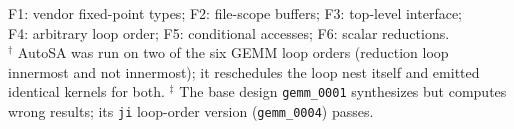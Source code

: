 \begin{table}[t]
{{\begin{tabular}{l ccc ccc ccc | cccccc}
\bottomrule
\end{tabular}
}
}
\vspace{2pt}
{\centering\footnotesize
F1: vendor fixed-point types; F2: file-scope buffers; F3: top-level interface; \\ F4: arbitrary loop order; F5: conditional accesses; F6: scalar reductions. \\
$^\dagger$ AutoSA was run on two of the six GEMM loop orders (reduction loop innermost and not innermost); it reschedules the loop nest itself and emitted identical kernels for both.
$^\ddagger$ The base design \texttt{gemm\_0001} synthesizes but computes wrong results; its \texttt{ji} loop-order version (\texttt{gemm\_0004}) passes.
}
\end{table}
